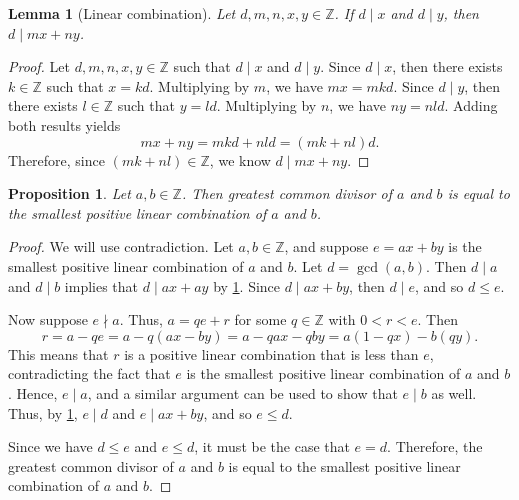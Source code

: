 \documentclass[10pt, titlepage]{amsart}
\newcommand\Z{{\mathbb Z}}
\newtheorem{lemma}{Lemma}[subsection]
\newtheorem{prop}{Proposition}[subsection]
\theoremstyle{definition}
\begin{document}
	\begin{lemma}[Linear combination]\label{lemma:linear_combination}
		Let $d,m,n,x,y \in \Z$. If $d \mid x$ and $d \mid y$, then $d \mid mx + ny$.
	\end{lemma}
	
	\begin{proof}
		Let $d,m,n,x,y \in \Z$ such that $d \mid x$ and $d \mid y$.
		Since $d \mid x$, then there exists $k \in \Z$ such that $x = kd$.
		Multiplying by $m$, we have  $mx = mkd$.
		Since $d \mid y$, then there exists $l \in \Z$ such that $y = ld$.
		Multiplying by $n$, we have  $ny = nld$.
		Adding both results yields $$ mx + ny = mkd + nld = (mk+nl)d.$$
		Therefore, since $(mk+nl) \in \Z$, we know $d \mid mx + ny$.
	\end{proof}
	
	\begin{prop}\label{proposition:smallest_possible_linear_combination}
		Let $a,b \in \Z$. Then greatest common divisor of $a$ and $b$ is equal to the smallest positive linear combination of $a$ and $b$.
	\end{prop}
	
	\begin{proof}
		We will use contradiction.
		Let $a,b \in \Z$, and suppose $e=ax+by$ is the smallest positive linear combination of $a$ and $b$.
		Let $d = \gcd(a,b)$. Then $d \mid a$ and $d \mid b$ implies that $d \mid ax + ay$ by 		\cref{lemma:linear_combination}.
		Since $d \mid ax+by$, then $d \mid e$, and so $d \leq e$.
		
		Now suppose $e \nmid a$. Thus, $a = qe + r$ for some $q \in \Z$ with $0 < r < e$. Then 
		$$r = a-qe = a-q(ax-by) = a-qax-qby = a(1-qx)- b(qy).$$
		This means that $r$ is a positive linear combination that is less than $e$, contradicting the fact that $e$ is the smallest positive linear combination of $a$ and $b$. Hence, $e \mid a$, and a similar argument can be used to show that $e \mid b$ as well. Thus, by \cref{lemma:linear_combination}, $e \mid d$ and $e \mid ax + by$, and so $e \leq d$.
		
		Since we have $d \leq e$ and $e \leq d$, it must be the case that $e=d$. Therefore, the greatest common divisor of $a$ and $b$ is equal to the smallest positive linear combination of $a$ and $b$.
	\end{proof}

	
\end{document}
